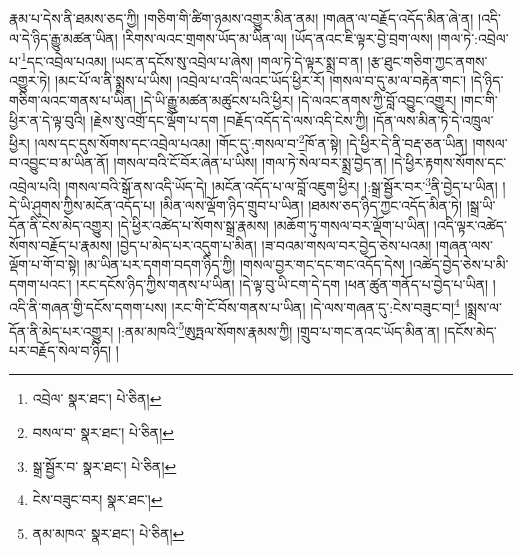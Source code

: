 རྣམ་པ་དེས་ནི་ཐམས་ཅད་ཀྱི། །གཅིག་གི་ཚིག་ཉམས་འགྱུར་མིན་ནམ། །གཞན་ལ་བརྗོད་འདོད་མིན་ཞེ་ན། །འདི་ལ་དེ་ཉིད་རྒྱུ་མཚན་ཡིན། །རིགས་ལའང་གྲགས་ཡོད་མ་ཡིན་ལ། །ཡོད་ནའང་ཇི་ལྟར་བྱེ་བྲག་ལས། །གལ་ཏེ་:འབྲེལ་པ་\footnote{འབྲེལ་  སྣར་ཐང་།  པེ་ཅིན། }དང་འབྲེལ་པའམ། །ཡང་ན་དངོས་སུ་འབྲེལ་པ་ཞེས། །གལ་ཏེ་དེ་ལྟར་སྨྲ་བ་ན། །རྩ་ཐུང་གཅིག་ཀྱང་ནགས་འགྱུར་ཏེ། །མང་པོ་ལ་ནི་སྨྲས་པ་ཡིས། །འབྲེལ་པ་འདི་ལའང་ཡོད་ཕྱིར་རོ། །གསལ་བ་དུ་མ་ལ་བརྟེན་གང་། །དེ་ཉིད་གཅིག་ལའང་གནས་པ་ཡིན། །དེ་ཡི་རྒྱུ་མཚན་མཚུངས་པའི་ཕྱིར། །དེ་ལའང་ནགས་ཀྱི་བློ་འབྱུང་འགྱུར། །གང་གི་ཕྱིར་ན་དེ་ལྟ་བུའི། །རྗེས་སུ་འགྲོ་དང་ལྡོག་པ་དག །བརྗོད་འདོད་དེ་ལས་འདི་ངེས་ཀྱི། །དོན་ལས་མིན་ཏེ་དེ་འཁྲུལ་ཕྱིར། །ལས་དང་དུས་སོགས་དང་འབྲེལ་པའམ། །གོང་དུ་:གསལ་བ་\footnote{བསལ་བ་  སྣར་ཐང་།  པེ་ཅིན། }ཁོ་ན་སྟེ། །དེ་ཕྱིར་དེ་ནི་བརྡ་ཅན་ཡིན། །གསལ་བ་འབྱུང་བ་མ་ཡིན་ནོ། །གསལ་བའི་ངོ་བོར་ཞེན་པ་ཡིས། །གལ་ཏེ་སེལ་བར་སྨྲ་བྱེད་ན། །དེ་ཕྱིར་རྟགས་སོགས་དང་འབྲེལ་པའི། །གསལ་བའི་སྒོ་ནས་འདི་ཡོད་དེ། །མངོན་འདོད་པ་ལ་བློ་འཇུག་ཕྱིར། །:སྒྲ་སྦྱོར་བར་\footnote{སྒྲ་སྦྱོར་བ་  སྣར་ཐང་།  པེ་ཅིན། }ནི་བྱེད་པ་ཡིན། །དེ་ཡི་ཤུགས་ཀྱིས་མངོན་འདོད་པ། །མིན་ལས་ལྡོག་ཉིད་གྲུབ་པ་ཡིན། །ཐམས་ཅད་ཉིད་ཀྱང་འདོད་མིན་ཏེ། །སྒྲ་ཡི་དོན་ནི་ངེས་མེད་འགྱུར། །དེ་ཕྱིར་འཚེད་པ་སོགས་སྒྲ་རྣམས། །མཆོག་ཏུ་གསལ་བར་ལྡོག་པ་ཡིན། །འདི་ལྟར་འཚེད་སོགས་བརྗོད་པ་རྣམས། །བྱེད་པ་མེད་པར་འདུག་པ་མིན། །ཟ་བའམ་གསལ་བར་བྱེད་ཅེས་པའམ། །གཞན་ལས་ལྡོག་པ་གོ་བ་སྟེ། །མ་ཡིན་པར་དགག་བདག་ཉིད་ཀྱི། །གསལ་བྱར་གང་དང་གང་འདོད་དེས། །འཚེད་བྱེད་ཅེས་པ་མི་དགག་པའང་། །རང་དངོས་ཉིད་ཀྱིས་གནས་པ་ཡིན། །དེ་ལྟ་བུ་ཡི་ངག་དེ་དག །ཕན་ཚུན་གནོད་པ་བྱེད་པ་ཡིན། །འདི་ནི་གཞན་གྱི་དངོས་དགག་པས། །རང་གི་ངོ་བོས་གནས་པ་ཡིན། །དེ་ལས་གཞན་དུ་:ངེས་བཟུང་བ།\footnote{ངེས་བཟུང་བར།  སྣར་ཐང་། } །སྨྲས་ལ་དོན་ནི་མེད་པར་འགྱུར། །:ནམ་མཁའི་\footnote{ནམ་མཁའ་  སྣར་ཐང་།  པེ་ཅིན། }ཨུཏྤལ་སོགས་རྣམས་ཀྱི། །གྲུབ་པ་གང་ནའང་ཡོད་མིན་ན། །དངོས་མེད་པར་བརྗོད་སེལ་བ་ཉིད། །
